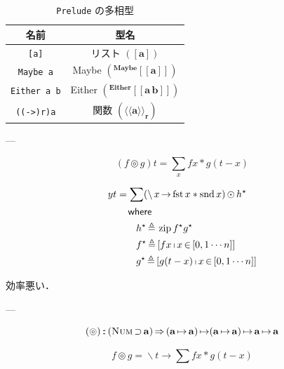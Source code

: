 \documentclass[a5paper,twoside,fleqn,draft]{jsbook}
\def\[{\left[\!\left[}
\def\]{\right]\!\right]}
\newcommand{\Langle}{\langle\!\langle}
\newcommand{\Rangle}{\rangle\!\rangle}
\newcommand{\code}[1]{\texttt{#1}}
\newcommand{\filename}[1]{\texttt{#1}}
\newcommand{\mKeyword}[1]{\mathsf{#1}} %
\newcommand{\mWhereKeyword}{\mKeyword{where}}
\DeclareMathOperator{\mSuperClass}{\Rightarrow}
\DeclareMathOperator{\mSuperSet}{\supset}
\DeclareMathOperator{\mWhere}{\mWhereKeyword}
\newcommand{\mSpecialFunc}[1]{\mathrm{#1}}
\DeclareMathOperator{\mFirst}{\mSpecialFunc{fst}}
\DeclareMathOperator{\mSecond}{\mSpecialFunc{snd}}
\DeclareMathOperator{\mZipFunc}{\mSpecialFunc{zip}}
\DeclareMathOperator{\mFrom}{\in}
\DeclareMathOperator{\mIn}{{:\!:}}
\DeclareMathOperator{\mLambda}{\backslash}
\DeclareMathOperator{\mLambdaArrow}{\rightarrow}
\DeclareMathOperator{\mLetEq}{\triangleq}
\DeclareMathOperator{\mMapList}{\odot}
\DeclareMathOperator{\mMapsTo}{\mapsto}
\newcommand{\mType}[1]{\mathbf{#1}}
\newcommand{\mFuncType}[2]{\Langle\mType{#1}\Rangle_\mType{#2}}
\newcommand{\mListType}[1]{[\mType{#1}]}
\newcommand{\mGenericTypeAssemble}[2]{{}^{\mType{#1}}\[\mType{#2}\]}
\newcommand{\mGenericTypeAssembleII}[3]{{}^{\mType{#1}}\[\mType{#2}\,\mType{#3}\]}
\newcommand{\mEitherType}[2]{\mGenericTypeAssembleII{Either}{#1}{#2}}
\newcommand{\mMaybeType}[1]{\mGenericTypeAssemble{Maybe}{#1}}
\newcommand{\mListWith}[1]{\left[#1\right]}
\newcommand{\mGenericTypeClass}[1]{\textsc{#1}} %
\newcommand{\mNumTypeClass}{\mGenericTypeClass{Num}}
\newcommand{\mList}[1]{{#1}^\mathrm{\star}}
\DeclareMathOperator{\mListComp}{\shortmid}
\newcommand{\mLambdaExp}[2]{\mLambda{#1}\mLambdaArrow{#2}}
\newcommand{\mProj}[2]{#1\mMapsTo#2}
\begin{document}
\begin{table}
\caption{\filename{Prelude} の多相型}
\label{tab:data-types-polymorphic}
\begin{center}
\begin{tabular}{||c|c||}
\hline
名前&型名\\
\hline\hline
\code{[a]}&リスト $(\mListType{a})$\\
\code{Maybe a}&Maybe $\left(\mMaybeType{a}\right)$\\
\code{Either a b}&Either $\left(\mEitherType{a}{b}\right)$\\
\code{((->)r)a}&関数 $\left(\mFuncType{a}{r}\right)$\\
\hline
\end{tabular}
\end{center}
\end{table}


---

\begin{equation}
(f\circledcirc g)t=\sum_xfx*g(t-x)
\end{equation}

\begin{equation}
\begin{aligned}
yt&=\sum(\mLambdaExp{x}{\mFirst x*\mSecond x})\mMapList\mList{h}\\
&\quad\mWhere\\
&\qquad\mList{h}\mLetEq{}\mZipFunc\mList{f}\mList{g}\\
&\qquad\mList{f}\mLetEq\mListWith{fx\mListComp x\mFrom\mListWith{0,1\dotsb n}}\\
&\qquad\mList{g}\mLetEq\mListWith{g(t-x)\mListComp x\mFrom\mListWith{0,1\dotsb n}}
\end{aligned}
\end{equation}

効率悪い．

---

\begin{equation}
(\circledcirc)\mIn{}(\mNumTypeClass\mSuperSet\mType{a})\mSuperClass{}
\mProj{
  (\mProj{\mType{a}}{\mType{a}})
}
{
  \mProj{(\mProj{\mType{a}}{\mType{a}})}
  {\mProj{\mType{a}}{\mType{a}}}
}
\end{equation}

\begin{equation}
f\circledcirc g=\mLambdaExp{t}{\sum fx*g(t-x)}
\end{equation}
\end{document}
